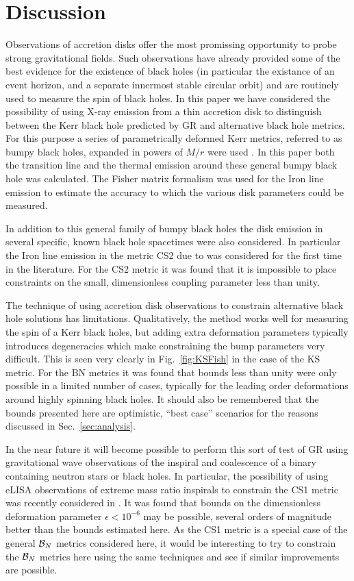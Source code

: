 \documentclass[aps,twocolumn,floatfix,superscriptaddress,longbibliography]{revtex4-1}
\begin{document}
\section{Discussion}\label{sec:discussion}
Observations of accretion disks offer the most promissing opportunity to probe strong gravitational fields. Such observations have already provided some of the best evidence for the existence of black holes (in particular the existance of an event horizon, and a separate innermost stable circular orbit) and are routinely used to measure the spin of black holes. In this paper we have considered the possibility of using X-ray emission from a thin accretion disk to distinguish between the Kerr black hole predicted by GR and alternative black hole metrics. For this purpose a series of parametrically deformed Kerr metrics, referred to as bumpy black holes, expanded in powers of $M/r$ were used \cite{2011PhRvD..83j4027V,2011PhRvD..84f4016G}. In this paper both the transition line and the thermal emission around these general bumpy black hole was calculated. The Fisher matrix formalism was used for the Iron line emission to estimate the accuracy to which the various disk parameters could be measured. 

In addition to this general family of bumpy black holes the disk emission in several specific, known black hole spacetimes were also considered. In particular the Iron line emission in the metric CS2 due to \cite{2012PhRvD..86d4037Y} was considered for the first time in the literature. For the CS2 metric it was found that it is impossible to place constraints on the small, dimensionless coupling parameter less than unity.

The technique of using accretion disk observations to constrain alternative black hole solutions has limitations. Qualitatively, the method works well for measuring the spin of a Kerr black holes, but adding extra deformation parameters typically introduces degeneracies which make constraining the bump parameters very difficult. This is seen very clearly in Fig.\ \ref{fig:KSFish} in the case of the KS metric. For the BN metrics it was found that bounds less than unity were only possible in a limited number of cases, typically for the leading order deformations around highly spinning black holes. It should also be remembered that the bounds presented here are optimistic, ``best case'' scenarios for the reasons discussed in Sec.\ \ref{sec:analysis}.

In the near future it will become possible to perform this sort of test of GR using gravitational wave observations of the inspiral and coalescence of a binary containing neutron stars or black holes. In particular, the possibility of using eLISA observations of extreme mass ratio inspirals to constrain the CS1 metric was recently considered in \cite{2012PhRvD..86d4010C}. It was found that bounds on the dimensionless deformation parameter $\epsilon<10^{-6}$ may be possible, several orders of magnitude better than the bounds estimated here. As the CS1 metric is a special case of the general ${\cal{B}}_{N}$ metrics considered here, it would be interesting to try to constrain the ${\cal{B}}_{N}$ metrics here using the same techniques and see if similar improvements are possible.

\clearpage



\clearpage


\end{document}
